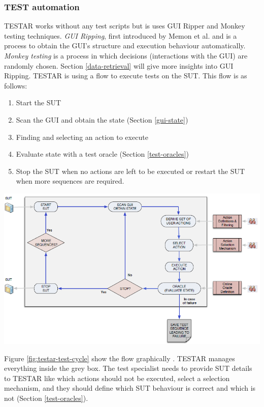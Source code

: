 \subsubsection{TEST automation} \label{testar-testauto}
TESTAR works without any test scripts but is uses GUI Ripper and Monkey testing techniques. \emph{GUI Ripping}, first introduced by Memon et al. \cite{gui-ripping} and is a process to obtain the GUI's structure and execution behaviour automatically. \emph{Monkey testing} is a process in which decisions (interactions with the GUI) are randomly chosen. Section \ref{data-retrieval} will give more insights into GUI Ripping.
TESTAR is using a flow to execute tests on the SUT. This flow is as follows:
\begin{enumerate}
    \item Start the SUT
    \item Scan the GUI and obtain the state (Section \ref{gui-state})
    \item Finding and selecting an action to execute
    \item Evaluate state with a test oracle (Section \ref{test-oracles})
    \item Stop the SUT when no actions are left to be executed or restart the SUT when more sequences are required.
\end{enumerate}

\begingroup
\captionsetup{type=figure}
\includegraphics[scale=0.8]{pics/testar-test-cycle.png}
\label{fig:testar-test-cycle}
\endgroup

Figure \ref{fig:testar-test-cycle} show the flow graphically \cite{VosAho2021}. TESTAR manages everything inside the grey box. The test specialist needs to provide SUT details to TESTAR like which actions should not be executed, select a selection mechanism, and they should define which SUT behaviour is correct and which is not (Section \ref{test-oracles}). 

